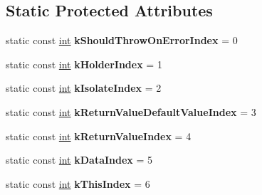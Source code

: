 \subsection*{Static Protected Attributes}
\begin{DoxyCompactItemize}
\item 
\mbox{\label{classv8_1_1PropertyCallbackInfo_aab5f05fed930b0cad97ed7f96520f60e}} 
static const \mbox{\hyperlink{classint}{int}} {\bfseries k\+Should\+Throw\+On\+Error\+Index} = 0
\item 
\mbox{\label{classv8_1_1PropertyCallbackInfo_a8598985473483dfadba4e4c67251675b}} 
static const \mbox{\hyperlink{classint}{int}} {\bfseries k\+Holder\+Index} = 1
\item 
\mbox{\label{classv8_1_1PropertyCallbackInfo_a59ba899cb580bc5e8adca6f799db3e2a}} 
static const \mbox{\hyperlink{classint}{int}} {\bfseries k\+Isolate\+Index} = 2
\item 
\mbox{\label{classv8_1_1PropertyCallbackInfo_a00849f770023891d1466176f5e0c8539}} 
static const \mbox{\hyperlink{classint}{int}} {\bfseries k\+Return\+Value\+Default\+Value\+Index} = 3
\item 
\mbox{\label{classv8_1_1PropertyCallbackInfo_ae16cdf2c6ce787b21d94953cd514ed0e}} 
static const \mbox{\hyperlink{classint}{int}} {\bfseries k\+Return\+Value\+Index} = 4
\item 
\mbox{\label{classv8_1_1PropertyCallbackInfo_a39fc5d6aaccb2916af503c7120ab99c5}} 
static const \mbox{\hyperlink{classint}{int}} {\bfseries k\+Data\+Index} = 5
\item 
\mbox{\label{classv8_1_1PropertyCallbackInfo_a715d28b9c57a581de1698673c9b9eb8a}} 
static const \mbox{\hyperlink{classint}{int}} {\bfseries k\+This\+Index} = 6
\end{DoxyCompactItemize}

